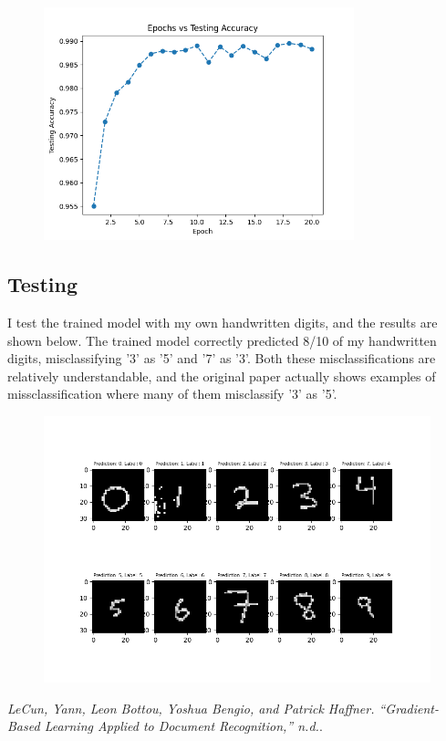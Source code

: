 \documentclass[11pt]{article}
\theoremstyle{definition}
\begin{document}
\begin{figure}[H]
\begin{center}
  \includegraphics[width=9cm,keepaspectratio]{images/test_acc.png}
\end{center}
\end{figure}


\subsection{Testing}

I test the trained model with my own handwritten digits, and the results are shown below. The trained model correctly predicted 8/10 of my handwritten digits, misclassifying '3' as '5' and '7' as '3'. Both these misclassifications are relatively understandable, and the original paper actually shows examples of missclassification where many of them misclassify '3' as '5'.


\begin{figure}[H]
\begin{center}
  \includegraphics[width=\linewidth,keepaspectratio]{images/my_results.png}
\end{center}
\end{figure}


\newpage
\begin{thebibliography}{999}

  \emph{LeCun, Yann, Leon Bottou, Yoshua Bengio, and Patrick Haffner. “Gradient-Based Learning Applied to Document Recognition,” n.d.}.

	
\end{thebibliography}
\end{document}
